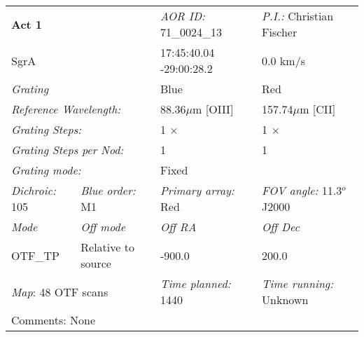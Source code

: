 %
\begin{table}
\centering
\begin{tabular}{llll}
\hline
\hline
\multicolumn{2}{l}{\bf Act 1}&{\sl AOR ID:}   71\_0024\_13&{\sl P.I.:} Christian Fischer\\
\multicolumn{2}{l}{SgrA}& 17:45:40.04 -29:00:28.2& 0.0 km/s\\
\hline
\hline
\multicolumn{2}{l}{\sl Grating} & Blue & Red\\
\hline
\multicolumn{2}{l}{\sl Reference Wavelength:} & 88.36$\mu$m [OIII] &157.74$\mu$m [CII]\\
\multicolumn{2}{l}{\sl Grating Steps:} & 1 $\times$ & 1 $\times$ \\
\multicolumn{2}{l}{\sl Grating Steps per Nod:} &1&1\\
\multicolumn{2}{l}{\sl Grating mode: }&  \multicolumn{2}{l}{Fixed}\\
\hline
\hline
{\sl Dichroic: } 105&{\sl Blue order: } M1&{\sl Primary array: } Red&{\sl FOV angle: } 11.3$^o$ J2000\\
\hline
\hline
{\sl Mode}&{\sl Off mode}&{\sl Off RA}&{\sl Off Dec}\\
\hline
OTF\_TP &Relative to source&-900.0&200.0\\
\hline
\hline
\multicolumn{2}{l}{{\sl Map}: 48 OTF scans}&{\sl Time planned: } 1440&{\sl Time running: } Unknown\\
\hline
\hline
\multicolumn{4}{l}{Comments: None}\\
\hline
\hline
\end{tabular}
\end{table}
%